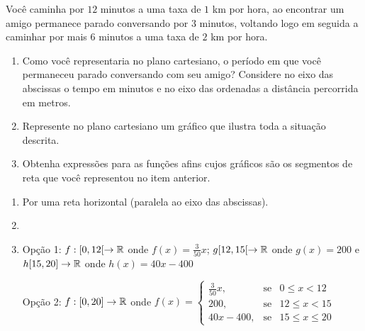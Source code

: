 \documentclass[10 pt,usenames,dvipsnames, oneside]{article}
\begin{document}
Você caminha por \(12\) minutos a uma taxa de \(1\) km por hora,  ao encontrar um amigo permanece parado conversando por \(3\) minutos, voltando logo em seguida  a caminhar por mais \(6\) minutos a uma taxa de \(2\) km por hora.
\begin{enumerate}
\item {} 
Como você representaria no plano cartesiano, o período em que você permaneceu parado conversando com seu amigo? Considere no eixo das abscissas o tempo em minutos e no eixo das ordenadas a distância percorrida em metros.

\item {} 
Represente no plano cartesiano um gráfico que ilustra toda a situação descrita.

\item {} 
Obtenha expressões para as funções afins cujos gráficos são os segmentos de reta que você representou no item anterior.

\end{enumerate}

\ifdefined\prof
\clearpage
\begin{solucao}
\begin{enumerate}

\item Por uma reta horizontal (paralela ao eixo das abscissas).

\item {}
{
}

\item Opção 1: $f:[0,12[\rightarrow\mathbb{R}$ onde $f(x)=\displaystyle\frac{3}{50}x$; $g[12,15[\rightarrow\mathbb{R}$ onde $g(x)=200$ e $h[15,20]\rightarrow\mathbb{R}$ onde $h(x)=40x-400$

Opção 2: $f:[0,20]\rightarrow\mathbb{R}$ onde $f(x) = \left\{ 
\begin{array}{rlll} \frac{3}{50}x, & \text{se} & 0\leq x <12 \\ 200, & \text{se} & 12\leq x < 15 \\ 40x-400, & \text{se} & 15 \leq x \leq 20 
\end{array} \right.$
\end{enumerate}
\end{solucao}
\fi
\end{document}
